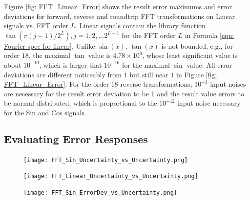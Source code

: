 \documentclass[twoside]{article}
\numberwithin{equation}{section}
\begin{document}
Figure \ref{fig: FFT_Linear_Error} shows the result error maximums and error deviations for forward, reverse and roundtrip FFT transformations on Linear signals vs. FFT order $L$.
Linear signals contain the library function $\tan(\pi (j - 1) /2^L), j = 1, 2, ... 2^{L-1}$ for the FFT order $L$ in Formula \eqref{eqn: Fourier spec for linear}.
Unlike $\sin(x)$, $\tan(x)$ is not bounded, e.g., for order $18$, the maximal $\tan$ value is $4.78 \times 10^6$, whose least significant value is about $10^{-10}$, which is larger that $10^{-16}$ for the maximal $\sin$ value.
All error deviations are different noticeably from $1$ but still near $1$ in Figure \ref{fig: FFT_Linear_Error}. 
For the order $18$ reverse transformations, $10^{-3}$ input noises are necessary for the result error deviation to be 1 and the result value errors to be normal distributed, which is proportional to the $10^{-12}$ input noise necessary for the Sin and Cos signals.


\subsection{Evaluating Error Responses}

\begin{figure}[p]
\centering
\texttt{[image: FFT\_Sin\_Uncertainty\_vs\_Uncertainty.png]} 
\label{fig: FFT_Sin_Uncertainty_vs_Uncertainty}
\end{figure}

\begin{figure}[p]
\centering
\texttt{[image: FFT\_Linear\_Uncertainty\_vs\_Uncertainty.png]} 
\label{fig: FFT_Linear_Uncertainty_vs_Uncertainty}
\end{figure}

\begin{figure}[p]
\centering
\texttt{[image: FFT\_Sin\_ErrorDev\_vs\_Uncertainty.png]} 
\label{fig: FFT_Sin_ErrorDev_vs_Uncertainty}
\end{figure}
\end{document}
